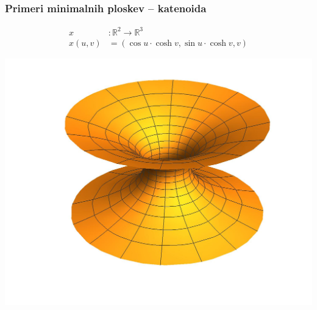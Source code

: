 \documentclass[9pt, table]{beamer}
\newcommand{\R}{\mathbb R}
\begin{document}

\begin{frame}
\frametitle{Primeri minimalnih ploskev -- katenoida}

\begin{align*}
x &\colon \R^{2} \to \R^{3} \\
x(u,v) &= (\cos u \cdot \cosh v, \sin u \cdot \cosh v, v)
\end{align*}
%
\begin{center}
\includegraphics[scale=0.5]{katenoida.jpg}
\end{center}

\end{frame}

\end{document}
